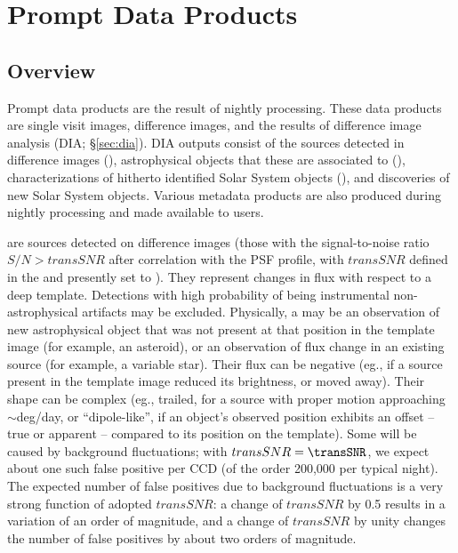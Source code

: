 \clearpage

\section{Prompt Data Products}
\label{sec:level1}

\subsection{Overview}

Prompt data products are the result of nightly processing. These data products are single visit images, difference images, and the results of difference image analysis (DIA; \S \ref{sec:dia}). DIA outputs consist of the sources detected in difference images (\DIASources), astrophysical objects that these are associated to (\DIAObjects), characterizations of hitherto identified Solar System objects (\SSObject), and discoveries of new Solar System objects. Various metadata products are also produced during nightly processing and made available to users.

\DIASources are sources detected on difference images (those with the signal-to-noise ratio $S/N>transSNR$ after correlation with the PSF profile, with $transSNR$ defined in the \SRD and presently set to \transSNR). They represent changes in flux with respect to a deep template. Detections with high probability of being instrumental non-astrophysical artifacts may be excluded. Physically, a \DIASource may be an observation of new astrophysical object that was not present at that position in the template image (for example, an asteroid), or an observation of flux change in an existing source (for example, a variable star). Their flux can be negative (eg., if a source present in the template image reduced its brightness, or moved away). Their shape can be complex (eg., trailed, for a source with proper motion approaching $\sim$deg/day, or ``dipole-like'', if an object's observed position exhibits an offset -- true or apparent -- compared to its position on the template).
Some \DIASources will be caused by background fluctuations; with $transSNR = \transSNR$,
we expect about one such false positive per CCD (of the order 200,000 per typical night). The expected number of false
positives due to background fluctuations is a very strong function of adopted $transSNR$: a change of $transSNR$ by 0.5
results in a variation of an order of magnitude, and a change of $transSNR$ by unity changes the number of false
positives by about two orders of magnitude.

